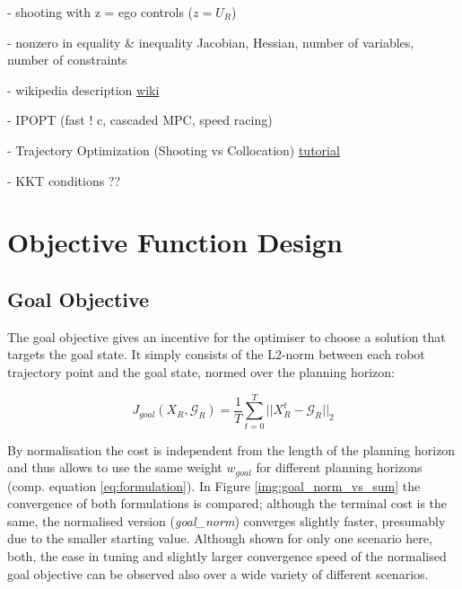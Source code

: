 - shooting with z = ego controls ($z = U_R$)

- nonzero in equality \& inequality Jacobian, Hessian, number of variables, number of constraints 

- wikipedia description \href{https://en.wikipedia.org/wiki/Trajectory_optimization}{wiki}

- IPOPT (fast ! c, cascaded MPC, speed racing)

- Trajectory Optimization (Shooting vs Collocation) \href{https://epubs.siam.org/doi/pdf/10.1137/16M1062569}{tutorial}

- KKT conditions ??

\section{Objective Function Design}
\label{text:approach/objective}

\subsection{Goal Objective}
\label{text:approach/objective/goal}
The goal objective gives an incentive for the optimiser to choose a solution that targets the goal state. It simply consists of the L2-norm between each robot trajectory point and the goal state, normed over the planning horizon:

\begin{equation}
J_{goal}(X_R, \mathcal{G}_R) = \frac{1}{T} \sum_{t = 0}^T ||X_R^t - \mathcal{G}_R||_2
\end{equation}

By normalisation the cost is independent from the length of the planning horizon and thus allows to use the same weight $w_{goal}$ for different planning horizons (comp. equation \ref{eq:formulation}). In Figure \ref{img:goal_norm_vs_sum} the convergence of both formulations is compared; although the terminal cost is the same, the normalised version (\textit{goal\_norm}) converges slightly faster, presumably due to the smaller starting value. Although shown for only one scenario here, both, the ease in tuning and slightly larger convergence speed of the normalised goal objective can be observed also over a wide variety of different scenarios.  

